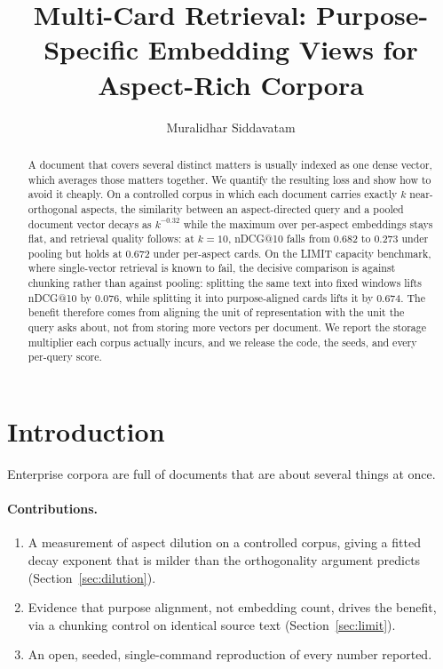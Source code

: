 \documentclass[runningheads]{llncs}
\newif\ifanon
\begin{document}
\title{Multi-Card Retrieval: Purpose-Specific Embedding Views for Aspect-Rich Corpora}

\ifanon
  \author{Anonymous}
  \institute{Anonymous}
\else
  \author{Muralidhar Siddavatam}
\fi

\maketitle

\begin{abstract}
A document that covers several distinct matters is usually indexed as one dense
vector, which averages those matters together. We quantify the resulting loss and
show how to avoid it cheaply. On a controlled corpus in which each document
carries exactly $k$ near-orthogonal aspects, the similarity between an
aspect-directed query and a pooled document vector decays as $k^{-0.32}$ while
the maximum over per-aspect embeddings stays flat, and retrieval quality follows:
at $k=10$, nDCG@10 falls from 0.682 to 0.273 under pooling but holds at 0.672
under per-aspect cards. On the LIMIT capacity benchmark, where single-vector
retrieval is known to fail, the decisive comparison is against chunking rather
than against pooling: splitting the same text into fixed windows lifts nDCG@10 by
0.076, while splitting it into purpose-aligned cards lifts it by 0.674. The
benefit therefore comes from aligning the unit of representation with the unit
the query asks about, not from storing more vectors per document. We report the
storage multiplier each corpus actually incurs, and we release the code, the
seeds, and every per-query score.
\end{abstract}

\section{Introduction}
\label{sec:intro}

Enterprise corpora are full of documents that are about several things at once.

\paragraph{Contributions.}
\begin{enumerate}
  \item A measurement of aspect dilution on a controlled corpus, giving a fitted
    decay exponent that is milder than the orthogonality argument predicts
    (Section~\ref{sec:dilution}).
  \item Evidence that purpose alignment, not embedding count, drives the benefit,
    via a chunking control on identical source text (Section~\ref{sec:limit}).
  \item An open, seeded, single-command reproduction of every number reported.
\end{enumerate}
\end{document}
